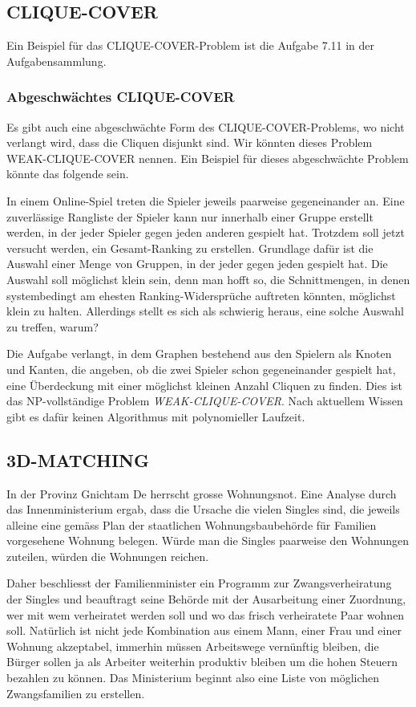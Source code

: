 \subsection{CLIQUE-COVER}
Ein Beispiel für das CLIQUE-COVER-Problem ist die Aufgabe 7.11 in der
Aufgabensammlung.

\subsubsection{Abgeschwächtes CLIQUE-COVER}
Es gibt auch eine abgeschwächte Form des CLIQUE-COVER-Problems, wo
nicht verlangt wird, dass die Cliquen disjunkt sind.
Wir könnten dieses Problem WEAK-CLIQUE-COVER nennen.
Ein Beispiel für dieses abgeschwächte Problem könnte das folgende sein.

\medskip

In einem Online-Spiel treten die Spieler jeweils paarweise gegeneinander an.
Eine zuverlässige Rangliste der Spieler kann nur innerhalb
einer Gruppe erstellt werden, in der jeder Spieler gegen
jeden anderen gespielt hat.
Trotzdem soll jetzt versucht werden,
ein Gesamt-Ranking zu erstellen.
Grundlage dafür ist die Auswahl
einer Menge von Gruppen, in der jeder gegen jeden gespielt hat.
Die Auswahl soll möglichst klein sein, denn man hofft so, die
Schnittmengen, in denen systembedingt am ehesten Ranking-Widersprüche
auftreten könnten, möglichst klein zu halten.
Allerdings stellt es
sich als schwierig heraus, eine solche Auswahl zu treffen, warum?

\medskip

Die Aufgabe verlangt, in dem Graphen bestehend aus den Spielern
als Knoten und Kanten, die angeben, ob die zwei Spieler schon gegeneinander
gespielt hat, eine Überdeckung mit einer möglichst
kleinen Anzahl Cliquen zu finden.
Dies ist das NP-vollständige Problem {\it WEAK-CLIQUE-COVER}.
Nach aktuellem Wissen gibt es dafür keinen
Algorithmus mit polynomieller Laufzeit.

\subsection{3D-MATCHING}
In der Provinz Gnichtam De herrscht grosse Wohnungsnot.
Eine Analyse durch das Innenministerium ergab, dass die Ursache
die vielen Singles sind, die jeweils alleine eine gemäss
Plan der staatlichen Wohnungsbaubehörde für Familien vorgesehene
Wohnung belegen.
Würde man die Singles paarweise den Wohnungen zuteilen, würden die
Wohnungen reichen.

Daher beschliesst der Familienminister ein Programm zur Zwangsverheiratung
der Singles und beauftragt seine Behörde mit der Ausarbeitung einer Zuordnung,
wer mit wem verheiratet werden soll und wo das frisch verheiratete Paar
wohnen soll.
Natürlich ist nicht jede Kombination aus einem Mann,
einer Frau und einer Wohnung akzeptabel, immerhin müssen 
Arbeitswege vernünftig bleiben, die Bürger sollen ja als 
Arbeiter weiterhin produktiv bleiben um die hohen Steuern bezahlen zu können.
Das Ministerium beginnt also eine Liste von möglichen Zwangsfamilien
zu erstellen.

